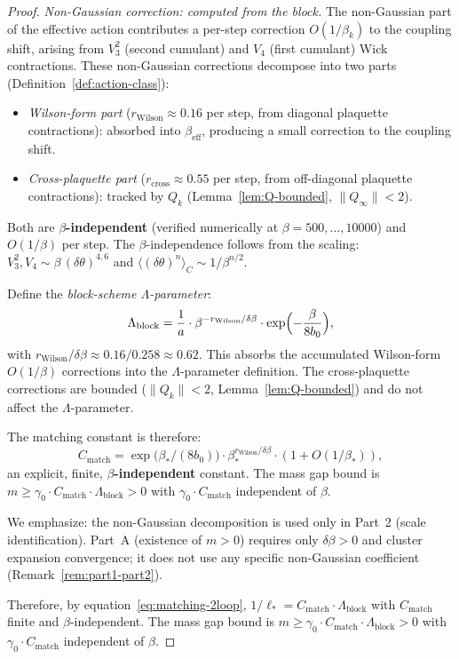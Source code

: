\documentclass[11pt]{article}
\theoremstyle{definition}
\begin{document}
\begin{proof}
\emph{Non-Gaussian correction: computed from the block.}
The non-Gaussian part of the effective action contributes
a per-step correction $O(1/\beta_k)$ to the
coupling shift, arising from $V_3^2$ (second cumulant) and
$V_4$ (first cumulant) Wick contractions.
These non-Gaussian corrections decompose into two parts
(Definition~\ref{def:action-class}):
\begin{itemize}[nosep]
\item \emph{Wilson-form part}
($r_{\mathrm{Wilson}}\approx 0.16$ per step,
from diagonal plaquette contractions):
absorbed into $\beta_{\mathrm{eff}}$,
producing a small correction to the coupling shift.
\item \emph{Cross-plaquette part}
($r_{\mathrm{cross}}\approx 0.55$ per step,
from off-diagonal plaquette contractions):
tracked by $Q_k$ (Lemma~\ref{lem:Q-bounded},
$\|Q_\infty\|<2$).
\end{itemize}
Both are \textbf{$\beta$-independent} (verified numerically
at $\beta=500,\ldots,10000$) and $O(1/\beta)$ per step.
The $\beta$-independence follows from the scaling:
$V_3^2,V_4\sim\beta\,(\delta\theta)^{4,6}$ and
$\langle(\delta\theta)^n\rangle_C\sim 1/\beta^{n/2}$.

Define the \emph{block-scheme $\Lambda$-parameter}:
\begin{equation}\label{eq:Lambda-2loop}
\Lambda_{\mathrm{block}}
=\frac{1}{a}\cdot\beta^{-r_{\mathrm{Wilson}}/\delta\beta}
\cdot\exp\Bigl(-\frac{\beta}{8b_0}\Bigr),
\end{equation}
with $r_{\mathrm{Wilson}}/\delta\beta\approx 0.16/0.258
\approx 0.62$.
This absorbs the accumulated Wilson-form $O(1/\beta)$
corrections into the $\Lambda$-parameter definition.
The cross-plaquette corrections are bounded
($\|Q_k\|<2$, Lemma~\ref{lem:Q-bounded}) and do not
affect the $\Lambda$-parameter.

The matching constant is therefore:
\begin{equation}\label{eq:matching-2loop}
C_{\mathrm{match}}
=\exp\bigl(\beta_*/(8b_0)\bigr)
\cdot\beta_*^{r_{\mathrm{Wilson}}/\delta\beta}
\cdot(1+O(1/\beta_*)),
\end{equation}
an explicit, finite, \textbf{$\beta$-independent} constant.
The mass gap bound is
$m\ge\gamma_0\cdot C_{\mathrm{match}}
\cdot\Lambda_{\mathrm{block}}>0$
with $\gamma_0\cdot C_{\mathrm{match}}$ independent of $\beta$.

We emphasize: the non-Gaussian decomposition is used only in
Part~2 (scale identification).  Part~A (existence of $m>0$)
requires only $\delta\beta>0$ and cluster expansion convergence;
it does not use any specific non-Gaussian coefficient
(Remark~\ref{rem:part1-part2}).

Therefore, by equation~\eqref{eq:matching-2loop},
$1/\ell_*=C_{\mathrm{match}}\cdot\Lambda_{\mathrm{block}}$
with $C_{\mathrm{match}}$ finite and $\beta$-independent.
The mass gap bound is
$m\ge\gamma_0\cdot C_{\mathrm{match}}\cdot\Lambda_{\mathrm{block}}>0$
with $\gamma_0\cdot C_{\mathrm{match}}$ independent of $\beta$.
\end{proof}
\end{document}
